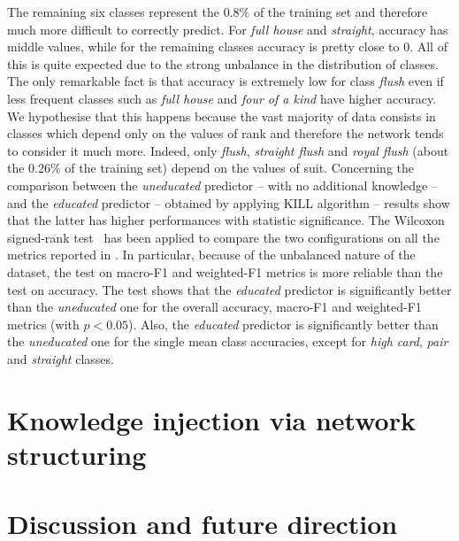 %
The remaining six classes represent the $0.8\%$ of the training set and therefore much more difficult to correctly predict.
%
For \emph{full house} and \emph{straight}, accuracy has middle values, while for the remaining classes accuracy is pretty close to $0$.
%
All of this is quite expected due to the strong unbalance in the distribution of classes.
%
The only remarkable fact is that accuracy is extremely low for class \emph{flush} even if less frequent classes such as \emph{full house} and \emph{four of a kind} have higher accuracy.
%
We hypothesise that this happens because the vast majority of data consists in classes which depend only on the values of rank and therefore the network tends to consider it much more.
%
Indeed, only \emph{flush}, \emph{straight flush} and \emph{royal flush} (about the $0.26\%$ of the training set) depend on the values of suit.
%
Concerning the comparison between the \emph{uneducated} predictor -- with no additional knowledge -- and the \emph{educated} predictor -- obtained by applying KILL algorithm -- results show that the latter has higher performances with statistic significance.
%
The Wilcoxon signed-rank test~\cite{wilcoxon1945} has been applied to compare the two configurations on all the metrics reported in .
%
In particular, because of the unbalanced nature of the dataset, the test on macro-F1 and weighted-F1 metrics is more reliable than the test on accuracy.
%
The test shows that the \emph{educated} predictor is significantly better than the \emph{uneducated} one for the overall accuracy, macro-F1 and weighted-F1 metrics (with $p < 0.05$).
%
Also, the \emph{educated} predictor is significantly better than the \emph{uneducated} one for the single mean class accuracies, except for \emph{high card}, \emph{pair} and \emph{straight} classes.


\section{Knowledge injection via network structuring}\label{sec:ski-contribution-kins}

\section{Discussion and future direction}\label{sec:ski-discussion-and-future-direction}